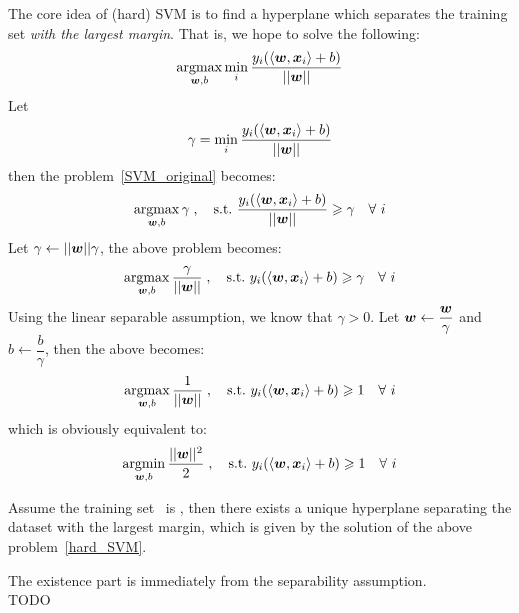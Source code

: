 The core idea of (hard) SVM is to find a hyperplane which separates the training set
\textit{with the largest margin}. That is, we hope to solve the following:
\begin{equation}\label{SVM_original}
    \operatorname*{argmax}_{\boldsymbol{w}, b}\min_i \frac{y_i(\langle\boldsymbol{w}, \boldsymbol{x}_i\rangle + b)}{||\boldsymbol{w}||}
\end{equation}
Let
$$\gamma =\min_i \frac{y_i(\langle\boldsymbol{w}, \boldsymbol{x}_i\rangle + b)}{||\boldsymbol{w}||}$$
then the problem~\eqref{SVM_original} becomes:
\begin{equation}
    \operatorname*{argmax}_{\boldsymbol{w}, b} \gamma\;,\quad \text{s.t.\ } \frac{y_i(\langle\boldsymbol{w}, \boldsymbol{x}_i\rangle + b)}{||\boldsymbol{w}||} \geqslant
     \gamma \quad\forall\ i
\end{equation}
Let $\gamma \gets ||\boldsymbol{w}||\gamma$, the above problem becomes:
\begin{equation}
    \operatorname*{argmax}_{\boldsymbol{w}, b} \frac{\gamma}{||\boldsymbol{w}||}\;,\quad \text{s.t.\ } y_i(\langle\boldsymbol{w}, \boldsymbol{x}_i\rangle + b) \geqslant
    \gamma \quad\forall\ i
\end{equation}
Using the linear separable assumption, we know that $\gamma > 0$. Let $\boldsymbol{w} \gets \dfrac{\boldsymbol{w}}{\gamma}$
and $b \gets \dfrac{b}{\gamma}$, then the above becomes:
\begin{equation}\label{SVM_argmax}
    \operatorname*{argmax}_{\boldsymbol{w}, b} \frac{1}{||\boldsymbol{w}||}\;,\quad \text{s.t.\ } y_i(\langle\boldsymbol{w}, \boldsymbol{x}_i\rangle + b) \geqslant 1
    \quad\forall\ i
\end{equation}
which is obviously equivalent to:
\begin{equation}\label{hard_SVM}
    \operatorname*{argmin}_{\boldsymbol{w}, b} \frac{||\boldsymbol{w}||^2}{2}\;,\quad \text{s.t.\ } y_i(\langle\boldsymbol{w}, \boldsymbol{x}_i\rangle + b) \geqslant 1
    \quad\forall\ i
\end{equation}

\begin{thm}
    Assume the training set \dataset\ is , then there exists a unique hyperplane 
    separating the dataset with the largest margin, which is given by the solution of the above 
    problem~\eqref{hard_SVM}.
\end{thm}
\begin{pf}
    The existence part is immediately from the separability assumption.\\
    TODO
\end{pf}

